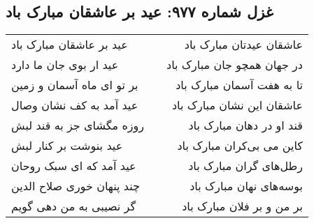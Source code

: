 \begin{center}
\section*{غزل شماره ۹۷۷: عید بر عاشقان مبارک باد}
\label{sec:0977}
\begin{longtable}{l p{0.5cm} r}
عید بر عاشقان مبارک باد
&&
عاشقان عیدتان مبارک باد
\\
عید ار بوی جان ما دارد
&&
در جهان همچو جان مبارک باد
\\
بر تو ای ماه آسمان و زمین
&&
تا به هفت آسمان مبارک باد
\\
عید آمد به کف نشان وصال
&&
عاشقان این نشان مبارک باد
\\
روزه مگشای جز به قند لبش
&&
قند او در دهان مبارک باد
\\
عید بنوشت بر کنار لبش
&&
کاین می بی‌کران مبارک باد
\\
عید آمد که ای سبک روحان
&&
رطل‌های گران مبارک باد
\\
چند پنهان خوری صلاح الدین
&&
بوسه‌های نهان مبارک باد
\\
گر نصیبی به من دهی گویم
&&
بر من و بر فلان مبارک باد
\\
\end{longtable}
\end{center}
